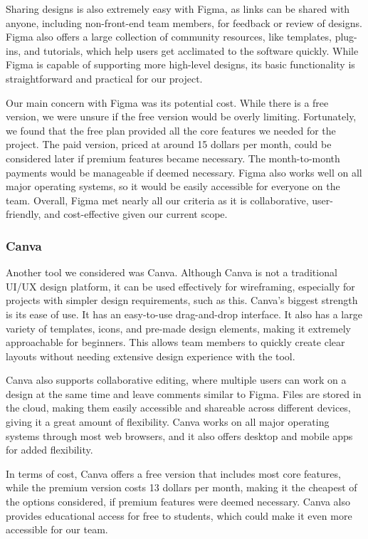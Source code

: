 \documentclass[12pt]{article}
\begin{document}
Sharing designs is also extremely easy with Figma, as links can be shared with anyone, including non-front-end team members, for feedback or review of designs. Figma also offers a large collection of community resources, like templates, plug-ins, and tutorials, which help users get acclimated to the software quickly. While Figma is capable of supporting more high-level designs, its basic functionality is straightforward and practical for our project.

Our main concern with Figma was its potential cost. While there is a free version, we were unsure if the free version would be overly limiting. Fortunately, we found that the free plan provided all the core features we needed for the project. The paid version, priced at around 15 dollars per month, could be considered later if premium features became necessary. The month-to-month payments would be manageable if deemed necessary. Figma also works well on all major operating systems, so it would be easily accessible for everyone on the team. Overall, Figma met nearly all our criteria as it is collaborative, user-friendly, and cost-effective given our current scope.

\subsubsection{Canva}
Another tool we considered was Canva. Although Canva is not a traditional UI/UX design platform, it can be used effectively for wireframing, especially for projects with simpler design requirements, such as this. Canva's biggest strength is its ease of use. It has an easy-to-use drag-and-drop interface. It also has a large variety of templates, icons, and pre-made design elements, making it extremely approachable for beginners. This allows team members to quickly create clear layouts without needing extensive design experience with the tool.

Canva also supports collaborative editing, where multiple users can work on a design at the same time and leave comments similar to Figma. Files are stored in the cloud, making them easily accessible and shareable across different devices, giving it a great amount of flexibility. Canva works on all major operating systems through most web browsers, and it also offers desktop and mobile apps for added flexibility.

In terms of cost, Canva offers a free version that includes most core features, while the premium version costs 13 dollars per month, making it the cheapest of the options considered, if premium features were deemed necessary. Canva also provides educational access for free to students, which could make it even more accessible for our team.
\end{document}
